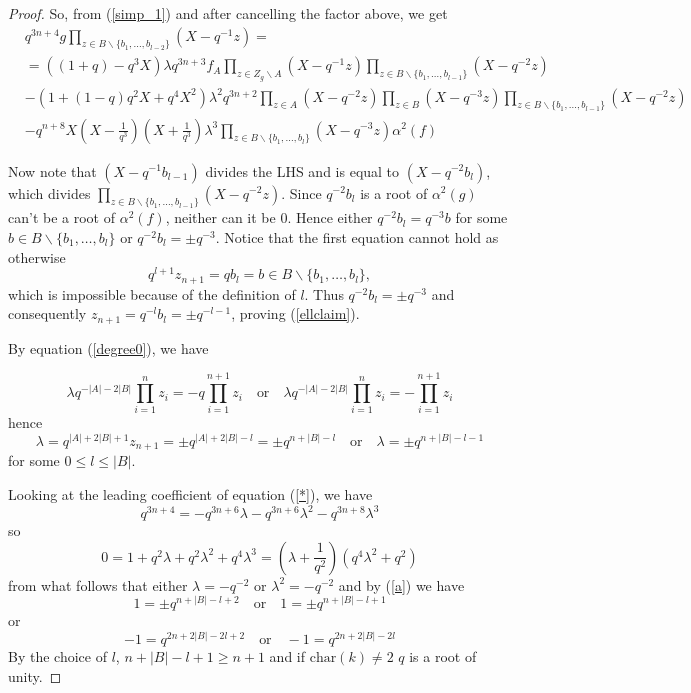 \documentclass[10pt,a4paper]{amsart}
\begin{document}
\begin{proof}
So, from (\ref{simp_1}) and after cancelling the factor above, we get
\begin{equation}\label{simp_1*}
\begin{split}
&q^{3n+4}g \prod_{z\in B\backslash \{b_1,\ldots,b_{l-2}\}}(X-q^{-1}z)=\\
&=\left((1+q)-q^3X\right)\lambda q^{3n+3}f_A\prod_{z\in Z_g\backslash A}(X-q^{-1}z)\prod_{z\in B\backslash \{b_1,\ldots,b_{l-1}\}}(X-q^{-2}z)\\
&-\left(1+(1-q)q^2X+q^4X^2\right)\lambda^2q^{3n+2}\prod_{z\in A}(X-q^{-2}z)\prod_{z\in B}(X-q^{-3}z)\prod_{z\in B\backslash \{b_1,\ldots,b_{l-1}\}}(X-q^{-2}z)\\
&-q^{n+8}X(X-\frac{1}{q^3})(X+\frac{1}{q^3})\lambda^3\prod_{z\in B\backslash\{b_1,\ldots,b_l\}}(X-q^{-3}z)\alpha^2(f)
\end{split}
\end{equation}

Now note that $(X-q^{-1}b_{l-1})$ divides the LHS and is equal to $(X-q^{-2}b_l)$, which divides $\prod_{z\in B\backslash \{b_1,\ldots,b_{l-1}\}}(X-q^{-2}z)$. Since $q^{-2}b_l$ is a root of $\alpha^2(g)$ can't be a root of $\alpha^2(f)$, neither can it be $0$. Hence either $q^{-2}b_l=q^{-3}b$ for some $b\in B\backslash\{b_1,\ldots,b_l\}$ or $q^{-2}b_l=\pm q^{-3}$. Notice that the first equation cannot hold as otherwise 
$$q^{l+1}z_{n+1}=qb_l=b\in B\backslash\{b_1,\ldots,b_l\},$$ 
which is impossible because of the definition of $l$. Thus $q^{-2}b_l=\pm q^{-3}$  and consequently $z_{n+1}=q^{-l}b_l=\pm q^{-l-1}$, proving (\ref{ellclaim}).



By equation (\ref{degree0}), we have

\begin{equation}
\lambda q^{-|A|-2|B|}\prod_{i=1}^nz_i=-q\prod_{i=1}^{n+1}z_i\quad \mbox{or}\quad \lambda q^{-|A|-2|B|}\prod_{i=1}^nz_i=-\prod_{i=1}^{n+1}z_i
\end{equation}
hence
\begin{equation}\label{a}
\lambda =q^{|A|+2|B|+1}z_{n+1}=\pm q^{|A|+2|B|-l}=\pm q^{n+|B|-l}\quad \mbox{or}\quad \lambda=\pm q^{n+|B|-l-1}
\end{equation}
for some $0\leq l\leq |B|$.

Looking at the leading coefficient of equation (\ref{*}), we have
$$q^{3n+4}=-q^{3n+6}\lambda-q^{3n+6}\lambda^2-q^{3n+8}\lambda^3$$
so $$0=1+q^2\lambda+q^2\lambda^2+q^4\lambda^3=(\lambda+\frac{1}{q^2})(q^4\lambda^2+q^2)$$
from what follows that either $\lambda=-q^{-2}$ or $\lambda^2=-q^{-2}$
and by (\ref{a}) we have
\begin{equation}
1=\pm q^{n+|B|-l+2}\quad \mbox{or}\quad 1=\pm q^{n+|B|-l+1}
\end{equation}
or
\begin{equation}\label{final}
-1=q^{2n+2|B|-2l+2}\quad \mbox{or}\quad -1=q^{2n+2|B|-2l}
\end{equation}
By the choice of $l$, $n+|B|-l+1\geq n+1$ and if $\mathrm{char}(k)\neq 2$ $q$ is a root of unity.


\end{proof}
\end{document}

